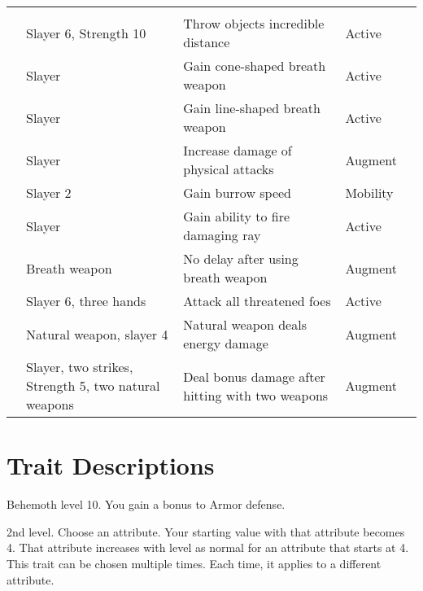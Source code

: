 \begin{longtabuwrapper}
\begin{longtabu}{>{\lcol}p{10em} >{\lcol}p{15em} >{\lcol}X >{\lcol}p{8em} >{\lcol}p{3em}}
            \midrule
            \label{Slayer Traits} &  &  &  &  \\
             & Slayer 6, Strength 10 & Throw objects incredible distance & Active &  \\
             & Slayer & Gain cone-shaped breath weapon & Active &  \\
             & Slayer & Gain line-shaped breath weapon & Active &  \\
             & Slayer & Increase damage of physical attacks & Augment &  \\
             & Slayer 2 & Gain burrow speed & Mobility &  \\
             & Slayer & Gain ability to fire damaging ray & Active &  \\
             & Breath weapon & No delay after using breath weapon & Augment &  \\
             & Slayer 6, three hands & Attack all threatened foes & Active &  \\
             & Natural weapon, slayer 4 & Natural weapon deals energy damage & Augment &  \\
             & Slayer, two strikes, Strength 5, two natural weapons & Deal bonus damage after hitting with two weapons & Augment &  \\
        \end{longtabu}
    \end{longtabuwrapper}

    \twocolumn

\section{Trait Descriptions}

    \featpre Behemoth level 10.
    \featben You gain a  bonus to Armor defense.

    \featpre 2nd level.
    \featben Choose an attribute.
    Your starting value with that attribute becomes 4.
    That attribute increases with level as normal for an attribute that starts at 4.
     This trait can be chosen multiple times.
    Each time, it applies to a different attribute.

